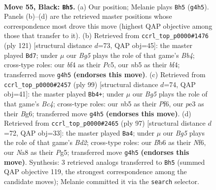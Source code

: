 \documentclass[11pt]{article}
\begin{document}
\clearpage

\begin{figure}[p]\centering
\begin{subfigure}{0.46\textwidth}\centering
\resizebox{\linewidth}{!}{%
\newchessgame
\chessboard[
  setfen={n7/1p1n3k/1b6/pN1p4/5Bbp/PP2P3/4P1K1/3B4 b - - 7 55},
  showmover=false,
  pgfstyle=straightmove, color=movearrow, markmove={g4-h5}
]}
\caption{}
\end{subfigure}\hfill
\begin{subfigure}{0.46\textwidth}\centering
\resizebox{\linewidth}{!}{%
\newchessgame
\chessboard[
  setfen={3b4/5n1k/1p3p2/1bpP3P/5B2/3P4/2K1B3/3N4 b - - 1 61},
  showmover=false,
  pgfstyle=straightmove, color=movearrow, markmove={b5-d7}
]}
\caption{}
\end{subfigure}
\\[4pt]
\begin{subfigure}{0.46\textwidth}\centering
\resizebox{\linewidth}{!}{%
\newchessgame
\chessboard[
  setfen={8/1p2k3/2p2pb1/p1b5/P4P2/1B2PP2/1P1K1N2/8 b - - 42 50},
  showmover=false,
  pgfstyle=straightmove, color=movearrow, markmove={c5-b4}
]}
\caption{}
\end{subfigure}\hfill
\begin{subfigure}{0.46\textwidth}\centering
\resizebox{\linewidth}{!}{%
\newchessgame
\chessboard[
  setfen={8/3bk3/5n2/2p2Pp1/2P1p1B1/4P2P/5K2/5N2 b - - 0 49},
  showmover=false,
  pgfstyle=straightmove, color=movearrow, markmove={d7-a4}
]}
\caption{}
\end{subfigure}
\caption{\textbf{Move 55, Black: \texttt{Bh5}.} (a) Our position; Melanie plays \texttt{Bh5} (\texttt{g4h5}). Panels (b)--(d) are the retrieved master positions whose correspondence most drove this move (highest QAP objective among those that transfer to it). (b) Retrieved from \texttt{ccrl\_top\_p0000\#1476} (ply 121) [structural distance $d$=73, QAP obj=45]: the master played \texttt{Bd7}; under $\mu$ our \emph{Bg5} plays the role of that game's \emph{Bb4}; cross-type roles: our \emph{b}f4 as their \emph{P}c5, our \emph{n}b5 as their \emph{b}f4; transferred move \texttt{g4h5} \textbf{(endorses this move)}. (c) Retrieved from \texttt{ccrl\_top\_p0000\#2457} (ply 99) [structural distance $d$=74, QAP obj=41]: the master played \texttt{Bb4+}; under $\mu$ our \emph{Bg5} plays the role of that game's \emph{Bc4}; cross-type roles: our \emph{n}b5 as their \emph{P}f6, our \emph{p}e3 as their \emph{B}g6; transferred move \texttt{g4h5} \textbf{(endorses this move)}. (d) Retrieved from \texttt{ccrl\_top\_p0000\#2465} (ply 97) [structural distance $d$=72, QAP obj=33]: the master played \texttt{Ba4}; under $\mu$ our \emph{Bg5} plays the role of that game's \emph{Bd2}; cross-type roles: our \emph{B}b6 as their \emph{N}f6, our \emph{N}a8 as their \emph{P}g5; transferred move \texttt{g4h5} \textbf{(endorses this move)}. Synthesis: 3 retrieved analogs transferred to \texttt{Bh5} (summed QAP objective 119, the strongest correspondence among the candidate moves); Melanie committed it via the \texttt{search} selector.}
\label{fig:thought-m109}
\end{figure}
\end{document}
